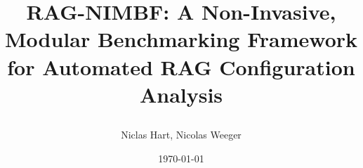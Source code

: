 \documentclass[11pt,a4paper]{article}
\title{
    \begin{center}
        RAG-NIMBF: A Non-Invasive, Modular Benchmarking Framework for Automated RAG Configuration Analysis
    \end{center}
}
\author{Niclas Hart, Nicolas Weeger}
\date{\today}
\begin{document}
\maketitle

\begin{abstract}

\end{abstract}

%
%
%
%
%
%

%
%
\end{document}
